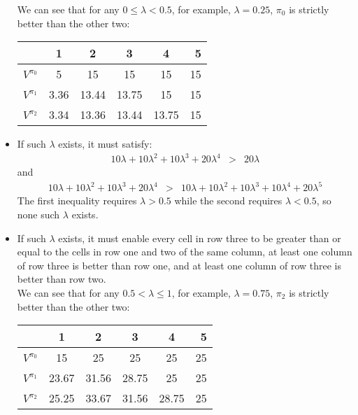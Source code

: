 \documentclass[11pt]{article}
\begin{document}
\begin{onehalfspace}
\begin{itemize}
    We can see that for any $0 \leq \lambda < 0.5$, for example, $\lambda = 0.25$, $\pi_0$ is strictly better than the other two:
     \begin{center}
    	\begin{tabular}{| l | c | c | c | c | r |}
	\hline
	& 1 & 2 & 3 & 4 & 5 \\ \hline
	$V^{\pi_0}$ & 5 & 15 & 15 & 15 & 15 \\ \hline
	$V^{\pi_1}$ & 3.36 & 13.44 & 13.75 & 15 & 15 \\ \hline
	$V^{\pi_2}$ & 3.34 & 13.36 & 13.44 & 13.75 & 15 \\
	\hline
	\end{tabular}
    \end{center}
    \item If such $\lambda$ exists, it must satisfy:
    \begin{eqnarray*}
    10\lambda + 10\lambda^2 + 10\lambda^3 + 20\lambda^4 &>& 20\lambda
    \end{eqnarray*}
    and
    \begin{eqnarray*}
    10\lambda + 10\lambda^2 + 10\lambda^3 + 20\lambda^4 &>& 10\lambda + 10\lambda^2 + 10\lambda^3 + 10\lambda^4 + 20\lambda^5
    \end{eqnarray*}
    The first inequality requires $\lambda > 0.5$ while the second requires $\lambda < 0.5$, so none such $\lambda$ exists.
    \item If such $\lambda$ exists, it must enable every cell in row three to be greater than or equal to the cells in row one and two of the same column, at least one column of row three is better than row one, and at least one column of row three is better than row two.\\
    We can see that for any $0.5 < \lambda \leq 1$, for example, $\lambda = 0.75$, $\pi_2$ is strictly better than the other two:
     \begin{center}
    	\begin{tabular}{| l | c | c | c | c | r |}
	\hline
	& 1 & 2 & 3 & 4 & 5 \\ \hline
	$V^{\pi_0}$ & 15 & 25 & 25 & 25 & 25 \\ \hline
	$V^{\pi_1}$ & 23.67 & 31.56 & 28.75 & 25 & 25 \\ \hline
	$V^{\pi_2}$ & 25.25 & 33.67 & 31.56 & 28.75 & 25 \\
	\hline
	\end{tabular}
    \end{center}
    \end{itemize}

\end{onehalfspace}
\end{document}
